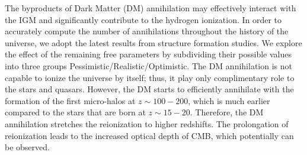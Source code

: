 The byproducts of Dark Matter (DM) annihilation may effectively interact with the IGM and significantly contribute to the hydrogen ionization. In order to accurately compute the number of annihilations throughout the history of the universe, we adopt the latest results from structure formation studies. We explore the effect of the remaining free parameters by subdividing their possible values into three groups Pessimistic/Realistic/Optimistic. The DM annihilation is not capable to ionize the universe by itself; thus, it play only complimentary role to the stars and quasars. However, the DM starts to efficiently annihilate with the formation of the first micro-halos at $z\sim100-200$, which is much earlier compared to the stars that are born at $z\sim15-20$. Therefore, the DM annihilation stretches the reionization to higher redshifts. The prolongation of reionization leads to the increased optical depth of CMB, which potentially can be observed.